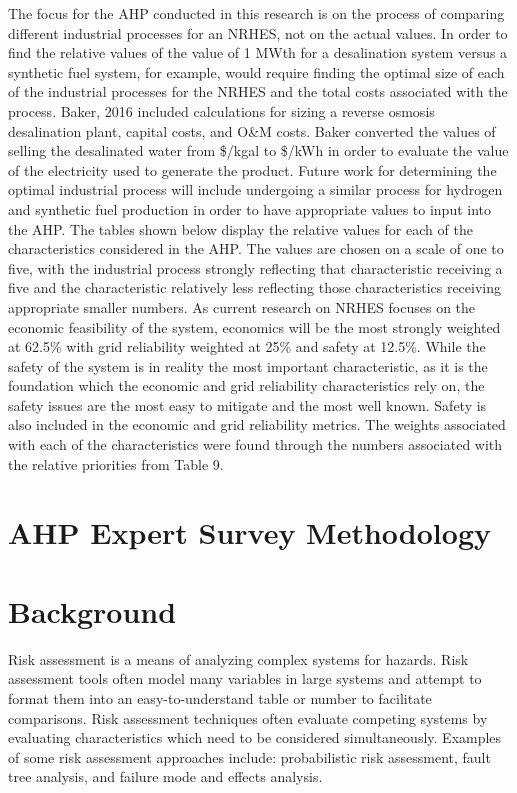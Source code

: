 \documentclass[12pt]{UIdahoMastersThesis}
\begin{document}
The focus for the AHP conducted in this research is on the process of comparing different industrial processes for an NRHES, not on the actual values. In order to find the relative values of the value of 1 MWth for a desalination system versus a synthetic fuel system, for example, would require finding the optimal size of each of the industrial processes for the NRHES and the total costs associated with the process.  Baker, 2016  included calculations for sizing a reverse osmosis desalination plant, capital costs, and O\&M costs.  Baker converted the values of selling the desalinated water from \$/kgal to \$/kWh in order to evaluate the value of the electricity used to generate the product. Future work for determining the optimal industrial process will include undergoing a similar process for hydrogen and synthetic fuel production in order to have appropriate values to input into the AHP.  The tables shown below display the relative values for each of the characteristics considered in the AHP. The values are chosen on a scale of one to five, with the industrial process strongly reflecting that characteristic receiving a five and the characteristic relatively less reflecting those characteristics receiving appropriate smaller numbers. As current research on NRHES focuses on the economic feasibility of the system, economics will be the most strongly weighted at 62.5\% with grid reliability weighted at 25\% and safety at 12.5\%.  While the safety of the system is in reality the most important characteristic, as it is the foundation which the economic and grid reliability characteristics rely on, the safety issues are the most easy to mitigate and the most well known. Safety is also included in the economic and grid reliability metrics. The weights associated with each of the characteristics were found through the numbers associated with the relative priorities from Table 9.

\section{AHP Expert Survey Methodology}
\section{Background}
Risk assessment is a means of analyzing complex systems for hazards. Risk assessment tools often model many variables in large systems and attempt to format them into an easy-to-understand table or number to facilitate comparisons. Risk assessment techniques often evaluate competing systems by evaluating characteristics which need to be considered simultaneously. Examples of some risk assessment approaches include: probabilistic risk assessment, fault tree analysis, and failure mode and effects analysis.
\end{document}
